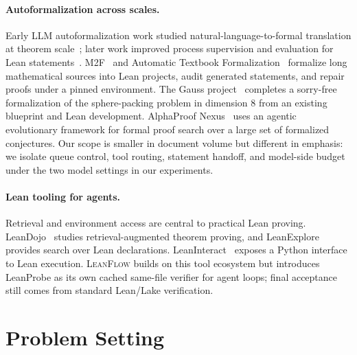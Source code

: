 \documentclass{article}
\newcommand{\method}{\textsc{LeanFlow}\xspace}
\newcommand{\lean}{Lean\xspace}
\begin{document}
\paragraph{Autoformalization across scales.}
Early LLM autoformalization work studied natural-language-to-formal translation at theorem scale~\citep{wu2022autoformalization}; later work improved process supervision and evaluation for \lean statements~\citep{lu2024process,poiroux2024reliable,poiroux2025rlmeval}.
M2F~\citep{wang2026m2f} and Automatic Textbook Formalization~\citep{gloeckle2026automatictextbookformalization} formalize long mathematical sources into \lean projects, audit generated statements, and repair proofs under a pinned environment.
The Gauss project~\citep{hariharan2026milestoneformalizationspherepacking} completes a sorry-free formalization of the sphere-packing problem in dimension 8 from an existing blueprint and \lean development.
AlphaProof Nexus~\citep{tsoukalas2026advancingmathematicsresearchaidriven} uses an agentic evolutionary framework for formal proof search over a large set of formalized conjectures.
Our scope is smaller in document volume but different in emphasis: we isolate queue control, tool routing, statement handoff, and model-side budget under the two model settings in our experiments.

\paragraph{Lean tooling for agents.}
Retrieval and environment access are central to practical \lean proving.
LeanDojo~\citep{yang2023leandojo} studies retrieval-augmented theorem proving, and LeanExplore~\citep{asher2025leanexplore} provides search over \lean declarations.
LeanInteract~\citep{leaninteract2025} exposes a Python interface to \lean execution.
\method builds on this tool ecosystem but introduces LeanProbe as its own cached same-file verifier for agent loops; final acceptance still comes from standard \lean/Lake verification.

\section{Problem Setting}
\end{document}
